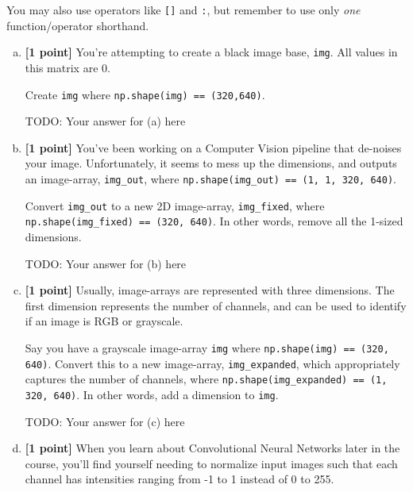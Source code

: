 You may also use operators like \texttt{[]} and \texttt{:}, but remember to use only \textit{one} function/operator shorthand.

\begin{enumerate}[(a)]
    \item \textbf{[1 point]} You're attempting to create a black image base, \texttt{img}. All values in this matrix are 0. 
    
    Create \texttt{img} where \texttt{np.shape(img) == (320,640)}.

    \begin{mdframed}
        TODO: Your answer for (a) here
    \end{mdframed}
    
    \item \textbf{[1 point]} You've been working on a Computer Vision pipeline that de-noises your image. Unfortunately, it seems to mess up the dimensions, and outputs an image-array, \texttt{img\_out}, where \texttt{np.shape(img\_out) == (1, 1, 320, 640)}. 
    
    Convert \texttt{img\_out} to a new 2D image-array, \texttt{img\_fixed}, where \texttt{np.shape(img\_fixed) == (320, 640)}. In other words, remove all the 1-sized dimensions.

    \begin{mdframed}
        TODO: Your answer for (b) here
    \end{mdframed}
    
    \item \textbf{[1 point]} Usually, image-arrays are represented with three dimensions. The first dimension represents the number of channels, and can be used to identify if an image is RGB or grayscale. 
    
    Say you have a grayscale image-array \texttt{img} where \texttt{np.shape(img) == (320, 640)}. Convert this to a new image-array, \texttt{img\_expanded}, which appropriately captures the number of channels, where \texttt{np.shape(img\_expanded) == (1, 320, 640)}. In other words, add a dimension to \texttt{img}.

    \begin{mdframed}
        TODO: Your answer for (c) here
    \end{mdframed}
    
    \item \textbf{[1 point]} When you learn about Convolutional Neural Networks later in the course, you'll find yourself needing to normalize input images such that each channel has intensities ranging from -1 to 1 instead of 0 to 255.
    

\end{enumerate}
